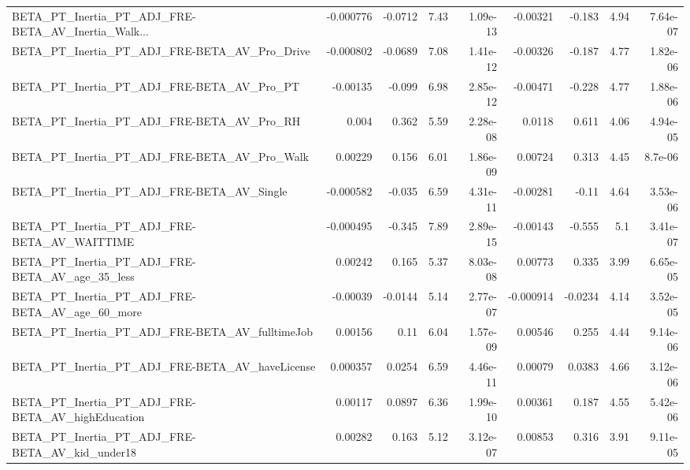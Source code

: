 \begin{tabular}{lrrrrrrrr}
BETA\_PT\_Inertia\_PT\_ADJ\_FRE-BETA\_AV\_Inertia\_Walk... &   -0.000776 &      -0.0712 &     7.43 & 1.09e-13 &   -0.00321 &      -0.183 &         4.94 &      7.64e-07 \\
BETA\_PT\_Inertia\_PT\_ADJ\_FRE-BETA\_AV\_Pro\_Drive       &   -0.000802 &      -0.0689 &     7.08 & 1.41e-12 &   -0.00326 &      -0.187 &         4.77 &      1.82e-06 \\
BETA\_PT\_Inertia\_PT\_ADJ\_FRE-BETA\_AV\_Pro\_PT          &    -0.00135 &       -0.099 &     6.98 & 2.85e-12 &   -0.00471 &      -0.228 &         4.77 &      1.88e-06 \\
BETA\_PT\_Inertia\_PT\_ADJ\_FRE-BETA\_AV\_Pro\_RH          &       0.004 &        0.362 &     5.59 & 2.28e-08 &     0.0118 &       0.611 &         4.06 &      4.94e-05 \\
BETA\_PT\_Inertia\_PT\_ADJ\_FRE-BETA\_AV\_Pro\_Walk        &     0.00229 &        0.156 &     6.01 & 1.86e-09 &    0.00724 &       0.313 &         4.45 &       8.7e-06 \\
BETA\_PT\_Inertia\_PT\_ADJ\_FRE-BETA\_AV\_Single          &   -0.000582 &       -0.035 &     6.59 & 4.31e-11 &   -0.00281 &       -0.11 &         4.64 &      3.53e-06 \\
BETA\_PT\_Inertia\_PT\_ADJ\_FRE-BETA\_AV\_WAITTIME        &   -0.000495 &       -0.345 &     7.89 & 2.89e-15 &   -0.00143 &      -0.555 &          5.1 &      3.41e-07 \\
BETA\_PT\_Inertia\_PT\_ADJ\_FRE-BETA\_AV\_age\_35\_less     &     0.00242 &        0.165 &     5.37 & 8.03e-08 &    0.00773 &       0.335 &         3.99 &      6.65e-05 \\
BETA\_PT\_Inertia\_PT\_ADJ\_FRE-BETA\_AV\_age\_60\_more     &    -0.00039 &      -0.0144 &     5.14 & 2.77e-07 &  -0.000914 &     -0.0234 &         4.14 &      3.52e-05 \\
BETA\_PT\_Inertia\_PT\_ADJ\_FRE-BETA\_AV\_fulltimeJob     &     0.00156 &         0.11 &     6.04 & 1.57e-09 &    0.00546 &       0.255 &         4.44 &      9.14e-06 \\
BETA\_PT\_Inertia\_PT\_ADJ\_FRE-BETA\_AV\_haveLicense     &    0.000357 &       0.0254 &     6.59 & 4.46e-11 &    0.00079 &      0.0383 &         4.66 &      3.12e-06 \\
BETA\_PT\_Inertia\_PT\_ADJ\_FRE-BETA\_AV\_highEducation   &     0.00117 &       0.0897 &     6.36 & 1.99e-10 &    0.00361 &       0.187 &         4.55 &      5.42e-06 \\
BETA\_PT\_Inertia\_PT\_ADJ\_FRE-BETA\_AV\_kid\_under18     &     0.00282 &        0.163 &     5.12 & 3.12e-07 &    0.00853 &       0.316 &         3.91 &      9.11e-05 \\

\end{tabular}
